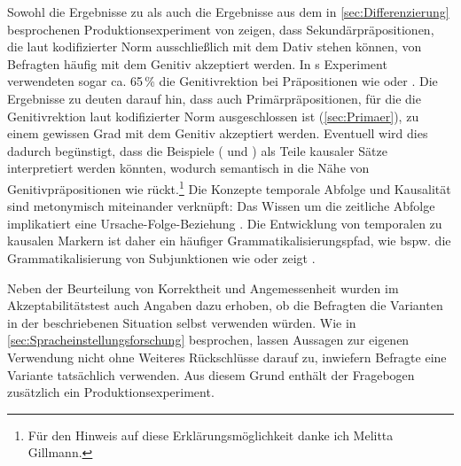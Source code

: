 \begin{sloppypar}
Sowohl die Ergebnisse zu \gegenueber{} als auch die Ergebnisse aus dem in \autoref{sec:Differenzierung} besprochenen Produktionsexperiment von \citet{Becker2011} zeigen, dass Sekundärpräpositionen, die laut kodifizierter Norm ausschließlich mit dem Dativ stehen können, von Befragten häufig mit dem Genitiv akzeptiert werden. 
In \citeauthor{Becker2011}s Experiment verwendeten sogar ca. 65\,\% die Genitivrektion bei Präpositionen wie  oder  \citep[s.][210]{Becker2011}. 
Die Ergebnisse zu  deuten darauf hin, dass auch Primärpräpositionen, für die die Genitivrektion laut kodifizierter Norm ausgeschlossen ist (\autoref{sec:Primaer}), zu einem gewissen Grad mit dem Genitiv akzeptiert werden. 
Eventuell wird dies dadurch begünstigt, dass die Beispiele ( und ) als Teile kausaler Sätze interpretiert werden könnten, wodurch  semantisch in die Nähe von Genitivpräpositionen wie \wegen{} rückt.\footnote{Für den Hinweis auf diese Erklärungsmöglichkeit danke ich Melitta Gillmann.}
Die Konzepte \glq temporale Abfolge\grq{} und \glq Kausalität\grq{} sind metonymisch miteinander verknüpft: Das Wissen um die zeitliche Abfolge implikatiert eine Ursache-Folge-Beziehung \citep[s.][]{Traugott.1991}.
Die Entwicklung von temporalen zu kausalen Markern ist daher ein häufiger Grammatikalisierungspfad, wie bspw. die Grammatikalisierung von Subjunktionen wie  oder  zeigt \citep[s.][]{Gillmann.2018}. 
\end{sloppypar}

Neben der Beurteilung von Korrektheit und Angemessenheit wurden im Akzeptabilitätstest auch Angaben dazu erhoben, ob die Befragten die Varianten in der beschriebenen Situation selbst verwenden würden. 
Wie in \autoref{sec:Spracheinstellungsforschung} besprochen, lassen Aussagen zur eigenen Verwendung nicht ohne Weiteres Rückschlüsse darauf zu, inwiefern Befragte eine Variante tatsächlich verwenden. 
Aus diesem Grund enthält der Fragebogen zusätzlich ein Produktionsexperiment.  

